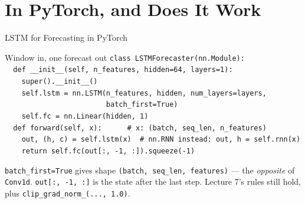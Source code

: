 \documentclass[aspectratio=169, 11pt]{beamer}
\begin{document}
\section{In PyTorch, and Does It Work}


\begin{frame}{LSTM for Forecasting in PyTorch}
  \begin{examplebox}{Window in, one forecast out}
    {\tiny\linespread{1.2}\selectfont
    \texttt{class LSTMForecaster(nn.Module):}\\
    \texttt{\mbox{}\ \ def \_\_init\_\_(self, n\_features, hidden=64, layers=1):}\\
    \texttt{\mbox{}\ \ \ \ super().\_\_init\_\_()}\\
    \texttt{\mbox{}\ \ \ \ self.lstm = nn.LSTM(n\_features, hidden, num\_layers=layers,}\\
    \texttt{\mbox{}\ \ \ \ \ \ \ \ \ \ \ \ \ \ \ \ \ \ \ \ \ \ \ \ batch\_first=True)}\\
    \texttt{\mbox{}\ \ \ \ self.fc = nn.Linear(hidden, 1)}\\[3pt]
    \texttt{\mbox{}\ \ def forward(self, x):\ \ \ \ \ \ \# x: (batch, seq\_len, n\_features)}\\
    \texttt{\mbox{}\ \ \ \ out, (h, c) = self.lstm(x)\ \ \# nn.RNN instead: out, h = self.rnn(x)}\\
    \texttt{\mbox{}\ \ \ \ return self.fc(out[:, -1, :]).squeeze(-1)}
    }
  \end{examplebox}
  \texttt{batch\_first=True} gives shape \texttt{(batch, seq\_len, features)} --- the
  \emph{opposite} of \texttt{Conv1d}. \texttt{out[:, -1, :]} is the state after the last step.
  Lecture 7's rules still hold, plus \texttt{clip\_grad\_norm\_(..., 1.0)}.
\end{frame}
\end{document}
